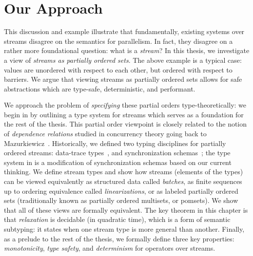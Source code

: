 \section{Our Approach}

This discussion and example illustrate that fundamentally, existing systems over streams disagree on the semantics for parallelism.
In fact, they disagree on a rather more foundational question: what is a \emph{stream}?
In this thesis, we investigate a view of \emph{streams as partially ordered sets}.
The above example is a typical case: values are unordered with respect to each other, but ordered with respect to barriers.
We argue that viewing streams as partially ordered sets allows for safe abstractions which are type-safe, deterministic, and performant.

We approach the problem of \emph{specifying} these partial orders type-theoretically: we begin in  by
outlining a type system for streams which serves as a foundation for the rest of the thesis.
This partial order viewpoint is closely related to the notion of \emph{dependence relations} studied in concurrency theory going back to Mazurkiewicz~\cite{mazurkiewicz1986trace}.
Historically, we defined two typing disciplines for partially ordered streams:
data-trace types~,
and synchronization schemas~;
the type system in  is a modification of synchronization schemas based on our current thinking.
We define stream types and show how streams (elements of the types) can be viewed equivalently as structured data called \emph{batches}, as finite sequences up to ordering equivalence called \emph{linearizations}, or as labeled partially ordered sets (traditionally known as partially ordered multisets, or pomsets).
We show that all of these views are formally equivalent.
The key theorem in this chapter is that \emph{relaxation} is decidable (in quadratic time), which is a form of semantic subtyping: it states when one stream type is more general than another.
Finally, as a prelude to the rest of the thesis, we formally define three key properties: \emph{monotonicity}, \emph{type safety}, and \emph{determinism} for operators over streams.

